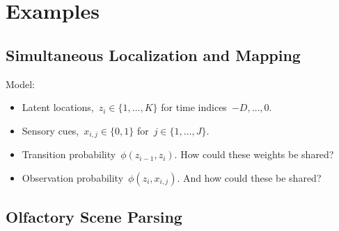 \section{Examples}


\subsection{Simultaneous Localization and Mapping}

Model:
\begin{itemize}
\item Latent locations,~$z_i \in \{1, \ldots, K\}$ for time indices~$-D, \ldots, 0$.
\item Sensory cues,~$x_{i,j} \in \{0,1\}$ for~$j \in \{1, \ldots, J\}$.
\item Transition probability~$\phi(z_{i-1}, z_i)$. How could these weights be shared?
\item Observation probability~$\phi(z_{i}, x_{i,j})$. And how could these be shared?
\end{itemize}

\subsection{Olfactory Scene Parsing}


